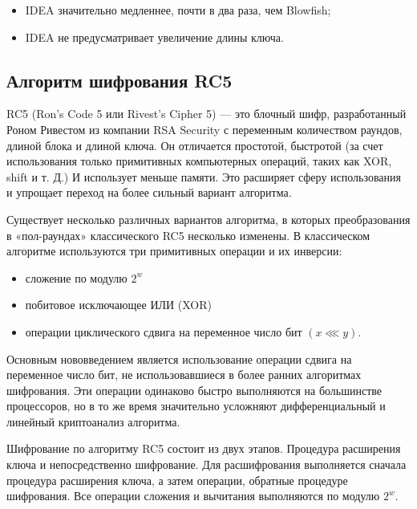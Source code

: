 \documentclass[a4paper]{report}
\begin{document}
\begin{itemize}
\item IDEA значительно медленнее, почти в два раза, чем Blowfish;
\item IDEA не предусматривает увеличение длины ключа.
\end{itemize}



\subsection{Алгоритм шифрования RC5}
RC5 (Ron’s Code 5 или Rivest’s Cipher 5) — это блочный шифр, разработанный Роном Ривестом из компании RSA Security с переменным количеством раундов, длиной блока и длиной ключа.
Он отличается простотой, быстротой (за счет использования только примитивных компьютерных операций, таких как XOR, shift и т. Д.) И использует меньше памяти.
Это расширяет сферу использования и упрощает переход на более сильный вариант алгоритма. 



Существует несколько различных вариантов алгоритма, в которых преобразования в «пол-раундах» классического RC5 несколько изменены. В классическом алгоритме используются три примитивных операции и их инверсии:
\begin{itemize}

\item сложение по модулю $\displaystyle 2^{w}$
\item побитовое исключающее ИЛИ (XOR)
\item операции циклического сдвига на переменное число бит $(x \lll y).$
\end{itemize}

Основным нововведением является использование операции сдвига на переменное число бит, не использовавшиеся в более ранних алгоритмах шифрования. Эти операции одинаково быстро выполняются на большинстве процессоров, но в то же время значительно усложняют дифференциальный и линейный криптоанализ алгоритма.

Шифрование по алгоритму RC5 состоит из двух этапов. Процедура расширения ключа и непосредственно шифрование. Для расшифрования выполняется сначала процедура расширения ключа, а затем операции, обратные процедуре шифрования. Все операции сложения и вычитания выполняются по модулю $\displaystyle 2^{w}$. 
\end{document}
